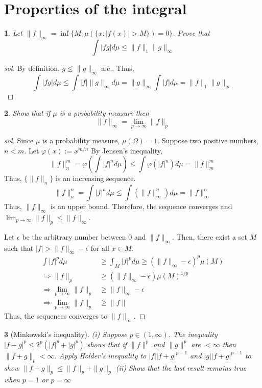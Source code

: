 \documentclass{report}
\newtheorem{ex}{}[section]
\begin{document}
\section{Properties of the integral}
\begin{ex}
Let $\|f\|_\infty = \inf\{M : \mu(\{x : |f(x)| > M\}) = 0\}$. Prove that
\[\int |fg| d\mu \le \|f\|_1\|g\|_\infty\]
\end{ex}
\begin{proof}[sol]
By definition, $g \le \|g\|_\infty$ a.e.. Thus,
\[\int |fg| d\mu \le \int |f|\|g\|_\infty d\mu = \|g\|_\infty \int|f|d\mu = \|f\|_1\|g\|_\infty\]
\end{proof}
\begin{ex}
Show that if $\mu$ is a probability measure then
\[\|f\|_\infty = \lim_{p\to\infty} \|f\|_p\]
\end{ex}
\begin{proof}[sol]
Since $\mu$ is a probability measure, $\mu(\Omega) = 1$.
Suppose two positive numbers, $n < m$. Let $\varphi(x) := x^{m/n}$ By Jensen's inequality,
\[\|f\|_n^m = \varphi(\int |f|^nd\mu) \le \int \varphi(|f|^n)d\mu  = \|f\|_m^m\]
Thus, $\{\|f\|_n\}$ is an increasing sequence.
\[\|f\|_n^n = \int |f|^nd\mu \le \int (\|f\|_\infty^n)d\mu  = \|f\|_\infty^n\]
Thus, $\|f\|_\infty$ is an upper bound. Therefore, the sequence converges and $\lim_{p\to\infty} \|f\|_p \le\|f\|_\infty$.

Let $\epsilon$ be the arbitrary number between 0 and $\|f\|_\infty$. Then, there exist a set $M$ such that $|f| > \|f\|_\infty - \epsilon$ for all $x \in M$.
\begin{align*}
    \int |f|^p d\mu &\ge \int_M |f|^p d\mu \ge (\|f\|_\infty - \epsilon)^p\mu(M)\\
    \Rightarrow \|f\|_p &\ge (\|f\|_\infty - \epsilon)\mu(M)^{1/p}\\
    \Rightarrow \lim_{p\to\infty} \|f\|_p &\ge \|f\|_\infty - \epsilon\\
    \Rightarrow \lim_{p\to\infty} \|f\|_p &\ge \|f\|
\end{align*}
Thus, the sequences converges to $\|f\|_\infty$.
\end{proof}
\begin{ex}[Minkowski's inequality]
(i) Suppose $p \in (1,\infty)$. The inequality $|f+g|^p \le 2^p(|f|^p + |g|^p)$ shows that if $\|f\|^p$ and $\|g\|^p$ are $<\infty$ then $\|f+g\|_p < \infty$. Apply Holder's inequality to $|f||f+g|^{p-1}$ and $|g||f+g|^{p-1}$ to show $\|f+g\|_p \le \|f\|_p + \|g\|_p$ (ii) Show that the last result remains true when $p = 1$ or $p = \infty$
\end{ex}
\end{document}
